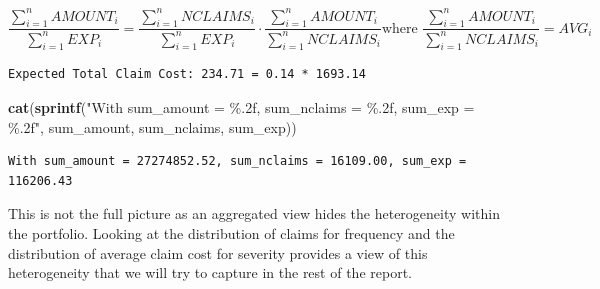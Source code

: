 \documentclass[
  english,
  11pt,
]{article}
\newenvironment{Shaded}{\begin{snugshade}}{\end{snugshade}}
\newcommand{\FunctionTok}[1]{\textcolor[rgb]{0.13,0.29,0.53}{\textbf{#1}}}
\newcommand{\NormalTok}[1]{#1}
\newcommand{\OtherTok}[1]{\textcolor[rgb]{0.56,0.35,0.01}{#1}}
\newcommand{\SpecialCharTok}[1]{\textcolor[rgb]{0.81,0.36,0.00}{\textbf{#1}}}
\newcommand{\StringTok}[1]{\textcolor[rgb]{0.31,0.60,0.02}{#1}}
\begin{document}
\[\frac{\sum_{i=1}^{n} AMOUNT_i}{\sum_{i=1}^{n} EXP_i} = \frac{\sum_{i=1}^{n} NCLAIMS_i}{\sum_{i=1}^{n} EXP_i} \cdot \frac{\sum_{i=1}^{n} AMOUNT_i}{\sum_{i=1}^{n} NCLAIMS_i}
\text{where } \frac{\sum_{i=1}^{n} AMOUNT_i}{\sum_{i=1}^{n} NCLAIMS_i} = AVG_i\]

\begin{Shaded}
\end{Shaded}

\begin{verbatim}
Expected Total Claim Cost: 234.71 = 0.14 * 1693.14
\end{verbatim}

\begin{Shaded}
\begin{Highlighting}[]
\FunctionTok{cat}\NormalTok{(}\FunctionTok{sprintf}\NormalTok{(}\StringTok{"With sum\_amount = \%.2f, sum\_nclaims = \%.2f, sum\_exp = \%.2f"}\NormalTok{, sum\_amount, sum\_nclaims, sum\_exp))}
\end{Highlighting}
\end{Shaded}

\begin{verbatim}
With sum_amount = 27274852.52, sum_nclaims = 16109.00, sum_exp = 116206.43
\end{verbatim}

This is not the full picture as an aggregated view hides the
heterogeneity within the portfolio. Looking at the distribution of
claims for frequency and the distribution of average claim cost for
severity provides a view of this heterogeneity that we will try to
capture in the rest of the report.
\end{document}
